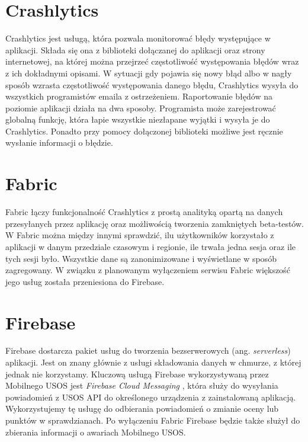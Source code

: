 \documentclass{pracamgr}
\begin{document}
\section{Crashlytics}

Crashlytics \cite{crashlytics} jest usługą, która pozwala monitorować błędy
występujące w aplikacji. Składa się ona z biblioteki dołączanej do aplikacji
oraz strony internetowej, na której można przejrzeć częstotliwość występowania
błędów wraz z ich dokładnymi opisami. W sytuacji gdy pojawia się nowy błąd albo
w nagły sposób wzrasta częstotliwość występowania danego błędu, Crashlytics wysyła
do wszystkich programistów emaila z ostrzeżeniem. Raportowanie błędów na poziomie
aplikacji działa na dwa sposoby. Programista może zarejestrować globalną funkcję,
która łapie wszystkie niezłapane wyjątki i wysyła je do Crashlytics. Ponadto przy
pomocy dołączonej biblioteki możliwe jest ręcznie wysłanie informacji o błędzie.

\section{Fabric}

Fabric \cite{fabric} łączy funkcjonalność Crashlytics z prostą analityką opartą na
danych przesyłanych przez aplikację oraz możliwością tworzenia zamkniętych
beta-testów. W Fabric można między innymi sprawdzić, ilu użytkowników korzystało
z aplikacji w danym przedziale czasowym i regionie, ile trwała jedna sesja oraz
ile tych sesji było. Wszystkie dane są zanonimizowane i wyświetlane w sposób
zagregowany. W związku z planowanym wyłączeniem serwisu Fabric większość jego
usług została przeniesiona do Firebase.

\section{Firebase}

Firebase \cite{firebase} dostarcza pakiet usług do tworzenia bezserwerowych
(ang. \textit{serverless}) aplikacji. Jest on znany głównie z usługi składowania
danych w chmurze, z której jednak nie korzystamy. Kluczową usługą Firebase
wykorzystywaną przez Mobilnego USOS jest \textit{Firebase Cloud Messaging}
\cite{firebasecm}, która służy do wysyłania powiadomień z USOS API do określonego
urządzenia z zainstalowaną aplikacją. Wykorzystujemy tę usługę do odbierania
powiadomień o zmianie oceny lub punktów w sprawdzianach. Po wyłączeniu Fabric
Firebase będzie także służył do zbierania informacji o awariach Mobilnego USOS.
\end{document}
